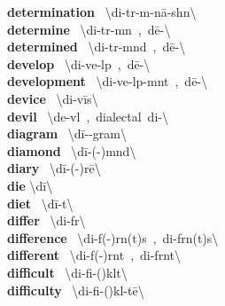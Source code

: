 \documentclass[10pt,a4paper]{article}
\begin{document}
\begin{multicols}{2}
\textbf{ determination }\quad \ \textbackslash di-\textsecstress t\textschwa r-m\textschwa -\textprimstress n\={a}-sh\textschwa n\textbackslash \\
\textbf{ determine }\quad \ \textbackslash di-\textprimstress t\textschwa r-m\textschwa n\ ,\ d\={e}-\textbackslash \\
\textbf{ determined }\quad \ \textbackslash di-\textprimstress t\textschwa r-m\textschwa nd\ ,\ d\={e}-\textbackslash \\
\textbf{ develop }\quad \ \textbackslash di-\textprimstress ve-l\textschwa p\ ,\ d\={e}-\textbackslash \\
\textbf{ development }\quad \ \textbackslash di-\textprimstress ve-l\textschwa p-m\textschwa nt\ ,\ d\={e}-\textbackslash \\
\textbf{ device }\quad \ \textbackslash di-\textprimstress v\={i}s\textbackslash \\
\textbf{ devil }\quad \ \textbackslash \textprimstress de-v\textsuperscript{\textreve}l\ ,\ dialectal\ \textprimstress di-\textbackslash \\
\textbf{ diagram }\quad \ \textbackslash \textprimstress d\={i}-\textschwa -\textsecstress gram\textbackslash \\
\textbf{ diamond }\quad \ \textbackslash \textprimstress d\={i}-(\textschwa -)m\textschwa nd\textbackslash \\
\textbf{ diary }\quad \ \textbackslash \textprimstress d\={i}-(\textschwa -)r\={e}\textbackslash \\
\textbf{ die }\quad \textbackslash \textprimstress d\={i}\textbackslash \\
\textbf{ diet }\quad \ \textbackslash \textprimstress d\={i}-\textschwa t\textbackslash \\
\textbf{ differ }\quad \ \textbackslash \textprimstress di-f\textschwa r\textbackslash \\
\textbf{ difference }\quad \ \textbackslash \textprimstress di-f(\textschwa -)r\textschwa n(t)s\ ,\ \textprimstress di-f\textschwa rn(t)s\textbackslash \\
\textbf{ different }\quad \ \textbackslash \textprimstress di-f(\textschwa -)r\textschwa nt\ ,\ \textprimstress di-f\textschwa rnt\textbackslash \\
\textbf{ difficult }\quad \ \textbackslash \textprimstress di-fi-(\textsecstress )k\textschwa lt\textbackslash \\
\textbf{ difficulty }\quad \ \textbackslash \textprimstress di-fi-(\textsecstress )k\textschwa l-t\={e}\textbackslash \\

\end{multicols}
\end{document}

